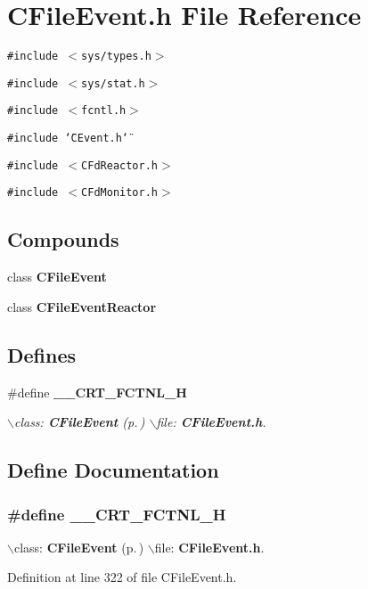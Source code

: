 \section{CFile\-Event.h File Reference}
\label{CFileEvent_8h}
{\tt \#include $<$sys/types.h$>$}\par
{\tt \#include $<$sys/stat.h$>$}\par
{\tt \#include $<$fcntl.h$>$}\par
{\tt \#include \char`\"{}CEvent.h\char`\"{}}\par
{\tt \#include $<$CFd\-Reactor.h$>$}\par
{\tt \#include $<$CFd\-Monitor.h$>$}\par
\subsection*{Compounds}
\begin{CompactItemize}
\item 
class {\bf CFile\-Event}
\item 
class {\bf CFile\-Event\-Reactor}
\end{CompactItemize}
\subsection*{Defines}
\begin{CompactItemize}
\item 
\#define {\bf \_\-\_\-CRT\_\-FCTNL\_\-H}
\begin{CompactList}\small\item\em $\backslash$class: {\bf CFile\-Event} {\rm (p.\,\pageref{classCFileEvent})} $\backslash$file: {\bf CFile\-Event.h}.\item\end{CompactList}\end{CompactItemize}


\subsection{Define Documentation}
\subsubsection{\setlength{\rightskip}{0pt plus 5cm}\#define \_\-\_\-CRT\_\-FCTNL\_\-H}\label{CFileEvent_8h_a0}


$\backslash$class: {\bf CFile\-Event} {\rm (p.\,\pageref{classCFileEvent})} $\backslash$file: {\bf CFile\-Event.h}.



Definition at line 322 of file CFile\-Event.h.